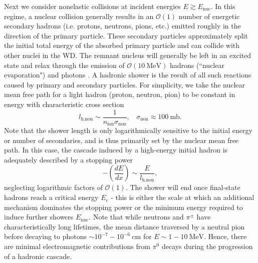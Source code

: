 \documentclass[twocolumn,showpacs,preprintnumbers,amsmath,amssymb,prd]{revtex4}
\newcommand{\OO}{\mathcal{O}}
\def\r{\right)}
\def\l{\left(}
\begin{document}
\begin{appendices}
Next we consider nonelastic collisions at incident energies $E \gtrsim E_\text{nuc}$.
In this regime, a nuclear collision generally results in an $\OO(1)$ number of energetic secondary hadrons (i.e.
protons, neutrons, pions, etc.) emitted roughly in the direction of the primary particle.
These secondary particles approximately split the initial total energy of the absorbed primary particle and can collide with other nuclei in the WD.
The remnant nucleus will generally be left in an excited state and relax through the emission of $\OO(10 ~\text{MeV})$ hadrons (``nuclear evaporation") and photons \cite{Rossi}.
A hadronic shower is the result of all such reactions caused by primary and secondary particles.
For simplicity, we take the nuclear mean free path for a light hadron (proton, neutron, pion) to be constant in energy with characteristic cross section
\begin{equation}
l_\text{h,non} \sim  \frac{1}{n_\text{ion} \sigma_\text{non}}, ~~~~ \sigma_\text{non} \approx 100 ~\text{mb}.
\end{equation}
Note that the shower length is only logarithmically sensitive to the initial energy or number of secondaries, and is thus primarily set by the nuclear mean free path.
In this case, the cascade induced by a high-energy initial hadron is adequately described by a stopping power
\begin{equation}
\label{eq:nucshower}
-\l \frac{dE}{dx}\r \sim \frac{E}{l_\text{h,non}},
\end{equation}
neglecting logarithmic factors of $\OO(1)$.
The shower will end once final-state hadrons reach a critical energy $E_c$ - this is either the scale at which an additional mechanism dominates the stopping power or the minimum energy required to induce further showers $E_\text{nuc}$.
Note that while neutrons and $\pi^\pm$ have characteristically long lifetimes, the mean distance traversed by a neutral pion before decaying to photons $\sim 10^{-7} - 10^{-6} ~\text{cm}$ for $E \sim 1 - 10 ~\text{MeV}$.
Hence, there are minimal electromagnetic contributions from $\pi^0$ decays during the progression of a hadronic cascade.


\end{appendices}
\end{document}
